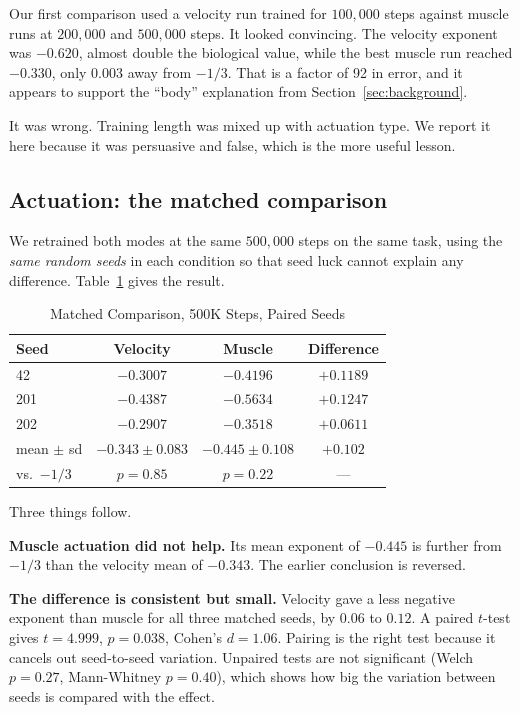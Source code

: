 \documentclass[conference]{IEEEtran}
\begin{document}
Our first comparison used a velocity run trained for $100{,}000$ steps against
muscle runs at $200{,}000$ and $500{,}000$ steps. It looked convincing. The
velocity exponent was $-0.620$, almost double the biological value, while the
best muscle run reached $-0.330$, only $0.003$ away from $-1/3$. That is a
factor of 92 in error, and it appears to support the ``body'' explanation from
Section~\ref{sec:background}.

It was wrong. Training length was mixed up with actuation type. We report it
here because it was persuasive and false, which is the more useful lesson.

\subsection{Actuation: the matched comparison}

We retrained both modes at the same $500{,}000$ steps on the same task, using
the \emph{same random seeds} in each condition so that seed luck cannot explain
any difference. Table~\ref{tab:actuation} gives the result.

\begin{table}[htbp]
\caption{Matched Comparison, 500K Steps, Paired Seeds}
\begin{center}
\setlength{\tabcolsep}{5pt}
\begin{tabular}{lccc}
\toprule
\textbf{Seed} & \textbf{Velocity} & \textbf{Muscle} & \textbf{Difference} \\
\midrule
42  & $-0.3007$ & $-0.4196$ & $+0.1189$ \\
201 & $-0.4387$ & $-0.5634$ & $+0.1247$ \\
202 & $-0.2907$ & $-0.3518$ & $+0.0611$ \\
\midrule
mean $\pm$ sd & $-0.343 \pm 0.083$ & $-0.445 \pm 0.108$ & $+0.102$ \\
vs.\ $-1/3$ & $p = 0.85$ & $p = 0.22$ & --- \\
\bottomrule
\end{tabular}
\label{tab:actuation}
\end{center}
\end{table}

Three things follow.

\textbf{Muscle actuation did not help.} Its mean exponent of $-0.445$ is
further from $-1/3$ than the velocity mean of $-0.343$. The earlier conclusion
is reversed.

\textbf{The difference is consistent but small.} Velocity gave a less negative
exponent than muscle for all three matched seeds, by $0.06$ to $0.12$. A paired
$t$-test gives $t = 4.999$, $p = 0.038$, Cohen's $d = 1.06$. Pairing is the
right test because it cancels out seed-to-seed variation. Unpaired tests are
not significant (Welch $p = 0.27$, Mann-Whitney $p = 0.40$), which shows how
big the variation between seeds is compared with the effect.
\end{document}

